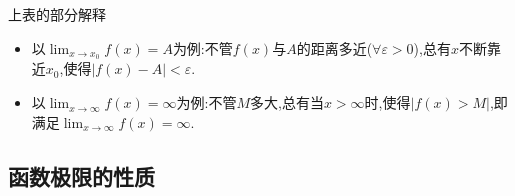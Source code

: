 \documentclass[12pt, a4paper, oneside, UTF8]{ctexbook}
\begin{document}
\begin{sloppypar}
\begin{center}
\begin{supertabular}{|c|c|c|c|c|}
        \end{supertabular}
    \end{center}
    \begin{criterion}{上表的部分解释}{}
        \begin{itemize}
            \item 以$\lim_{x \to x_0}f(x)=A$为例:不管$f(x)$与$A$的距离多近($\forall \varepsilon >0$),总有$x$不断靠近$x_0$,使得$|f(x)-A|<\varepsilon$.
            \item 以$\lim_{x\to \infty}f(x)=\infty$为例:不管$M$多大,总有当$x>\infty$时,使得$|f(x)>M|$,即满足$\lim_{x\to \infty}f(x)=\infty$.
        \end{itemize}
    \end{criterion}
    \subsection{函数极限的性质}

\end{sloppypar}
\end{document}
